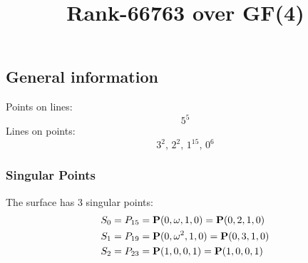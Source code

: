 \documentclass{article}
\newcommand\setTBstruts{\def\T{\rule{0pt}{2.6ex}}%
\def\B{\rule[-1.2ex]{0pt}{0pt}}}
\newcommand{\bP}{{\bf P}}
\begin{document}
 
\setTBstruts



{\allowdisplaybreaks%






\title{Rank-66763 over GF(4)}
\author{}%
\maketitle%
%
{}



\subsection*{General information}
Points on lines:
$$
5^5$$
Lines on points:
$$
3^2,\,2^2,\,1^{15},\,0^6$$
\subsubsection*{Singular Points}
The surface has 3 singular points:\\
\begin{align*}
S_{0} &= P_{15}=\bP(0, \omega , 1, 0) = \bP(0, 2, 1, 0)\\
S_{1} &= P_{19}=\bP(0, \omega^{2}, 1, 0) = \bP(0, 3, 1, 0)\\
S_{2} &= P_{23}=\bP(1, 0, 0, 1) = \bP(1, 0, 0, 1)\\
\end{align*}
}
\end{document}
